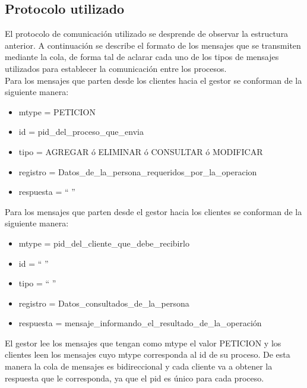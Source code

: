 \documentclass[11pt]{article}
\begin{document}
\subsection{Protocolo utilizado}
El protocolo de comunicaci\'on utilizado se desprende de observar la estructura anterior. A continuaci\'on se describe el formato 
de los mensajes que se transmiten mediante la cola, de forma tal de aclarar cada uno de los tipos de mensajes utilizados para establecer la 
comunicaci\'on entre los procesos. \\
Para los mensajes que parten desde los clientes hacia el gestor se conforman de la siguiente manera:
\begin{itemize}
 \item mtype = PETICION
 \item id = pid\_del\_proceso\_que\_envia
 \item tipo = AGREGAR \'o ELIMINAR \'o CONSULTAR \'o MODIFICAR
 \item registro = Datos\_de\_la\_persona\_requeridos\_por\_la\_operacion
 \item respuesta = `` ''
\end{itemize}


Para los mensajes que parten desde el gestor hacia los clientes se conforman de la siguiente manera:
\begin{itemize}
 \item mtype = pid\_del\_cliente\_que\_debe\_recibirlo
 \item id = `` ''
 \item tipo = `` ''
 \item registro = Datos\_consultados\_de\_la\_persona
 \item respuesta = mensaje\_informando\_el\_resultado\_de\_la\_operaci\'on
\end{itemize}

El gestor lee los mensajes que tengan como mtype el valor PETICION y los clientes leen los mensajes cuyo mtype corresponda al id de su proceso.
De esta manera la cola de mensajes es bidireccional y cada cliente va a obtener la respuesta que le corresponda, ya que el pid es único para cada proceso.
\end{document}
